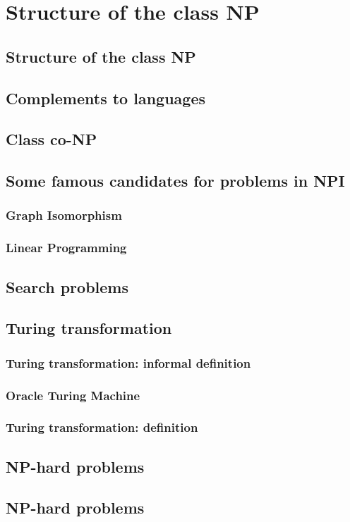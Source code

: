 \documentclass{article}
\theoremstyle{definition}
\begin{document}
\section{Structure of the class NP}
\subsection{Structure of the class NP}
\subsection{Complements to languages}
\subsection{Class co-NP}
\subsection{Some famous candidates for problems in NPI}
\subsubsection{Graph Isomorphism}
\subsubsection{Linear Programming}
\subsection{Search problems}
\subsection{Turing transformation}
\subsubsection{Turing transformation: informal definition}
\subsubsection{Oracle Turing Machine}
\subsubsection{Turing transformation: definition}
\subsection{NP-hard problems}
\subsection{NP-hard problems}
\end{document}
